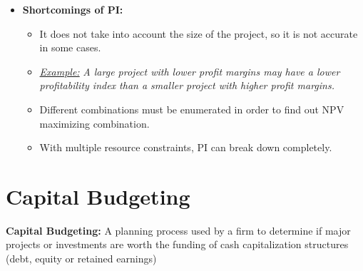 \documentclass[ieeetran]{article}
\begin{document}
\begin{itemize}
\begin{itemize}
\end{itemize}
\item \textbf{Shortcomings of PI:}
	\begin{itemize}
	  \item It does not take into account the size of the project, so it is not accurate in some cases.
	\item \underline{\textit{Example:}} \textit{A large project with lower profit margins may have a lower profitability index than a smaller project with higher profit margins.}
	\item Different combinations must be enumerated in order to find out NPV maximizing combination.
	\item With multiple resource constraints, PI can break down completely.
	\end{itemize}

\end{itemize}

\section{Capital Budgeting} %
\label{sub:capital_budgeting}
\textbf{Capital Budgeting:} A planning process used by a firm to determine if major projects or investments are worth the funding of cash capitalization structures (debt, equity or retained earnings)







\end{document}
